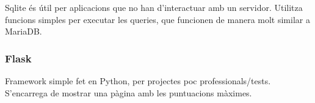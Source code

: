 Sqlite \'es \'util per aplicacions que no han d'interactuar amb un servidor.
Utilitza funcions simples per executar les queries,
que funcionen de manera molt similar a MariaDB.

\subsubsection{Flask}
Framework simple fet en Python, per projectes poc professionals/tests.
S'encarrega de mostrar una p\`agina amb les puntuacions m\`aximes.

